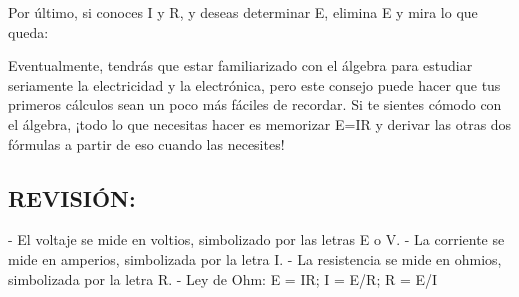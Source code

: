 \documentclass[output=paper, 
colorlinks,
citecolor=brown,
newtxmath
]{langscibook}
\begin{document}
Por último, si conoces I y R, y deseas determinar E, elimina E y mira lo que queda:

Eventualmente, tendrás que estar familiarizado con el álgebra para estudiar seriamente la electricidad y la electrónica, pero este consejo puede hacer que tus primeros cálculos sean un poco más fáciles de recordar. Si te sientes cómodo con el álgebra, ¡todo lo que necesitas hacer es memorizar E=IR y derivar las otras dos fórmulas a partir de eso cuando las necesites!

\subsection{REVISIÓN:}

- El voltaje se mide en voltios, simbolizado por las letras E o V.
- La corriente se mide en amperios, simbolizada por la letra I.
- La resistencia se mide en ohmios, simbolizada por la letra R.
- Ley de Ohm: E = IR; I = E/R; R = E/I
\end{document}
